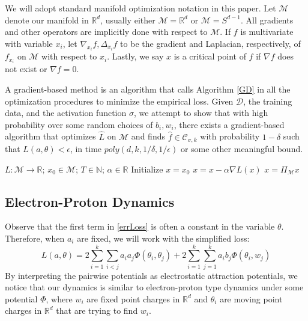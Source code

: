 \documentclass{article}
\newcommand{\N}{{\mathbb{N}}}
\newcommand{\R}{{\mathbb{R}}}
\begin{document}
We will adopt standard manifold optimization notation in this paper. Let $\mathcal{M}$ denote our manifold in $\R^d$, usually either $\mathcal{M}= \R^d$ or $\mathcal{M} =  S^{d-1}$. All gradients and other operators are implicitly done with respect to $\mathcal{M}$.  If $f$ is multivariate with variable $x_i$, let $\nabla_{x_i}f, \Delta_{x_i}f$ to be the gradient and Laplacian, respectively, of $f_{x_i}$ on $\mathcal{M}$ with respect to $x_i$. Lastly, we say $x$ is a critical point of $f$ if $\nabla f$ does not exist or $\nabla f = 0$.

A gradient-based method is an algorithm that calls Algorithm \ref{GD} in all the optimization procedures to minimize the empirical loss. Given $\mathcal{D}$, the training data, and the activation function $\sigma$, we attempt to show that with high probability over some random choices of $b_i, w_i$, there exists a gradient-based algorithm that optimizes $\widehat{L}$ on $\mathcal{M}$ and finds $\widehat{f} \in \mathcal{C}_{\sigma, k}$ with probability $1-\delta$ such that $L(a,\theta) <\epsilon$, in time $poly(d,k,1/\delta,1/\epsilon)$ or some other meaningful bound.

\begin{algorithm}[hb]
 \caption{$x = GradientDescent(L,x_0, T,\alpha$)}
   \label{GD}
\begin{algorithmic}
    $L: \mathcal{M} \to \R$; $x_0 \in \mathcal{M}$; $T\in \N$; $\alpha\in \R$
   \STATE Initialize $x = x_0$
   \STATE $x = x - \alpha\nabla L(x)$
   \STATE $x = \Pi_\mathcal{M} x$
   \ENDFOR
\end{algorithmic}
\end{algorithm}

\subsection{Electron-Proton Dynamics}

Observe that the first term in \eqref{errLoss} is often a constant in the variable $\theta$. Therefore, when $a_i$ are fixed, we will work with the simplified loss:
\begin{equation}\label{errSimp}
L(a,\theta) =  2\sum_{i=1}^k\sum_{i < j} a_ia_j\Phi(\theta_i,\theta_j) + 2\sum_{i=1}^k\sum_{j=1}^ka_ib_j \Phi(\theta_i,w_j)
\end{equation}
By interpreting the pairwise potentials as electrostatic attraction potentials, we notice that our dynamics is similar to electron-proton type dynamics under some potential $\Phi$, where $w_i$ are fixed point charges in $\R^d$ and $\theta_i$ are moving point charges in $\R^d$ that are trying to find $w_i$. 
\end{document}

